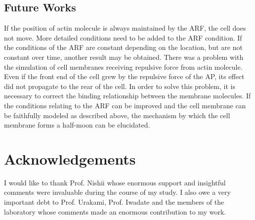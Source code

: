 \documentclass[a4paper,12pt, oneside]{book}
\begin{document}
\section{Future Works}
If the position of actin molecule is always maintained by the ARF, the cell does not move.
More detailed conditions need to be added to the ARF condition.
If the conditions of the ARF are constant depending on the location, but are not constant over time, another result may be obtained.
There was a problem with the simulation of cell membranes receiving repulsive force from actin molecule.
Even if the front end of the cell grew by the repulsive force of the AP, its effect did not propagate to the rear of the cell.
In order to solve this problem, it is necessary to correct the binding relationship between the membrane molecules.
If the conditions relating to the ARF can be improved and the cell membrane can be faithfully modeled as described above, the mechanism by which the cell membrane forms a half-moon can be elucidated.

\chapter*{Acknowledgements}
I would like to thank Prof. Nishii whose enormous support and insightful comments were invaluable during the course of my study. I also owe a very important debt to Prof. Urakami, Prof. Iwadate and the members of the laboratory whose comments made an enormous contribution to my work. 




\end{document}

